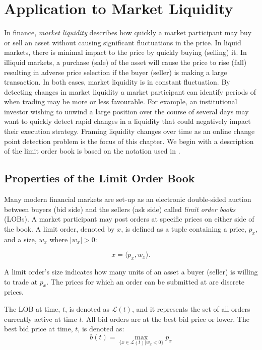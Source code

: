 \chapter{Application to Market Liquidity}
In finance, \textit{market liquidity} describes how quickly a market participant may buy or sell an asset without causing significant fluctuations in the price. In liquid markets, there is minimal impact to the price by quickly buying (selling) it. In illiquid markets, a purchase (sale) of the asset will cause the price to rise (fall) resulting in adverse price selection if the buyer (seller) is making a large transaction. In both cases, market liquidity is in constant fluctuation. By detecting changes in market liquidity a market participant can identify periods of when trading may be more or less favourable. For example, an institutional investor wishing to unwind a large position over the course of several days may want to quickly detect rapid changes in a liquidity that could negatively impact their execution strategy. Framing liquidity changes over time as an online change point detection problem is the focus of this chapter. We begin with a description of the limit order book is based on the notation used in \cite{gould2016queue}. 

\section{Properties of the Limit Order Book}
Many modern financial markets are set-up as an electronic double-sided auction between buyers (bid side) and the sellers (ask side) called \textit{limit order books} (LOBs). A market participant may post orders at specific prices on either side of the book. A limit order, denoted by $x$, is defined as a tuple containing a price, $p_x$, and a size, $w_x$ where $|w_x|>0$:

\begin{equation}
x = \langle p_x, w_x \rangle.
\end{equation}

A limit order's size indicates how many units of an asset a buyer (seller) is willing to trade at $p_x$. The prices for which an order can be submitted at are discrete prices. 

The LOB at time, $t$, is denoted as $\mathcal{L}(t)$, and it represents the set of all orders currently active at time $t$. All bid orders are at the best bid price or lower. The best bid price at time, $t$,  is denoted as:
\begin{equation}
b(t) =  \max_{\{x \in \mathcal{L}(t)|w_x<0 \}} p_x
\end{equation}

